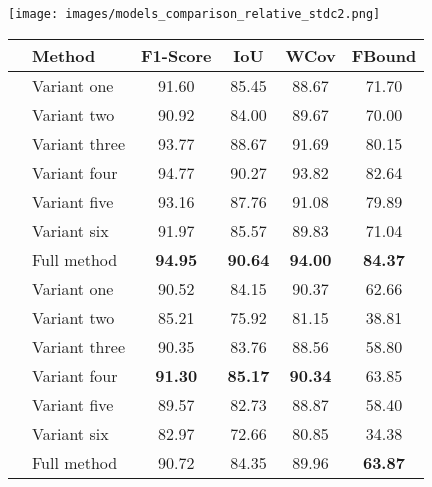 \documentclass[10pt,twocolumn,letterpaper]{article}
\begin{document}
\begin{figure}[t]
\centering
    \texttt{[image: images/models\_comparison\_relative\_stdc2.png]}
    \vspace{-.7cm}
    \label{fig:models_by_number_of_training_images}
\hfill
\vspace{2.9mm}

 \begin{tabular}{c l c c c c}
 \midrule
 & \multicolumn{1}{l}{Method} & \multicolumn{1}{c}{F1-Score} & \multicolumn{1}{c}{IoU} & 
 \multicolumn{1}{c}{WCov} & \multicolumn{1}{c}{FBound}\\
 \midrule
 \parbox[t]{3mm}{} 
& Variant one
& 91.60 & 85.45 & 88.67 & 71.70\\
& Variant two
& 90.92 & 84.00 & 89.67 & 70.00\\
& Variant three
& 93.77 & 88.67 & 91.69 & 80.15 \\
& Variant four
& 94.77 & 90.27 & 93.82 & 82.64\\
& Variant five
& 93.16 & 87.76 & 91.08 & 79.89 \\
& Variant six
& 91.97 & 85.57 & 89.83 & 71.04\\
& Full method
& \textbf{94.95} & \textbf{90.64} & \textbf{94.00} & \textbf{84.37}\\
\midrule
\midrule
 \parbox[t]{3mm}{} 
& Variant one
& 90.52 & 84.15 & 90.37 & 62.66\\
& Variant two
& 85.21 & 75.92 & 81.15 & 38.81\\
& Variant three
& 90.35 & 83.76 & 88.56 & 58.80 \\
& Variant four
& \textbf{91.30} & \textbf{85.17} & \textbf{90.34} & 63.85\\
& Variant five
& 89.57 & 82.73 & 88.87 & 58.40 \\
& Variant six
& 82.97 & 72.66 & 80.85 & 34.38\\
& Full method
& 90.72 & 84.35 & 89.96 & \textbf{63.87}\\
\midrule
 \end{tabular}
\label{tab:ablation_conditioning_methods}

\vspace{-6mm}
\end{figure}
\end{document}
